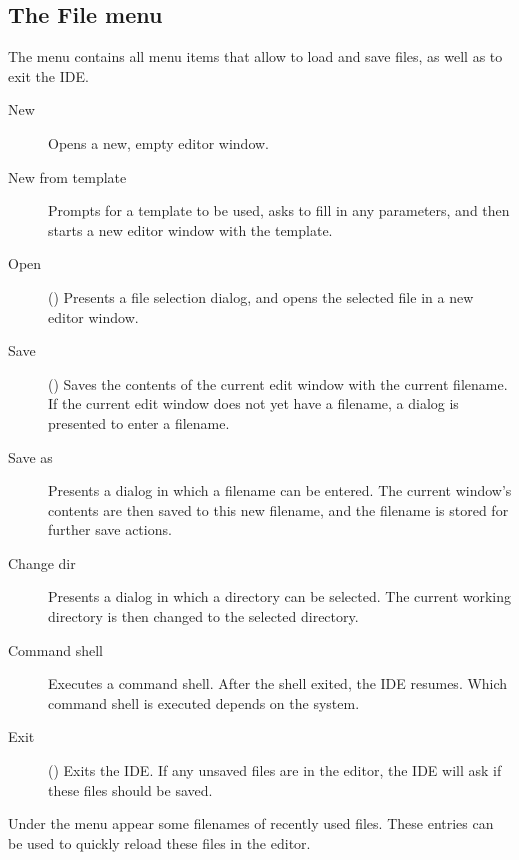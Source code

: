 \subsection{The File menu}
\label{se:menufile}
The  menu contains all menu items that allow to load and save
files, as well as to exit the IDE.
\begin{description}
\item[New] Opens a new, empty editor window.
\item[New from template] Prompts for a template to be used, asks to fill in
any parameters, and then starts a new editor window with the template.
\item[Open] () Presents a file selection dialog, and opens
the selected file in a new editor window.
\item[Save] () Saves the contents of the current edit window
with the current filename. If the current edit window does not yet have
a filename, a dialog is presented to enter a filename.
\item[Save as] Presents a dialog in which a filename can be entered. The
current window's contents are then saved to this new filename, and the
filename is stored for further save actions.
\item[Change dir] Presents a dialog in which a directory can be selected.
The current working directory is then changed to the selected directory.
\item[Command shell] Executes a command shell. After the shell exited, the
IDE resumes. Which command shell is executed depends on the system.
\item[Exit] () Exits the IDE. If any unsaved files are
in the editor, the IDE will ask if these files should be saved.
\end{description}
Under the  menu appear some filenames of recently used files.
These entries can be used to quickly reload these files in the editor.

%
%
